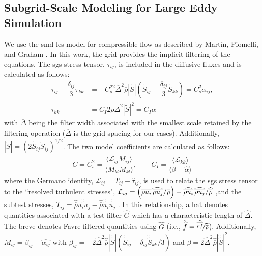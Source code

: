 \subsection{Subgrid-Scale Modeling for Large Eddy Simulation}
We use the \gls{smd} \gls{les} model for compressible flow as described by Mart\'{i}n, Piomelli, and Graham \cite{LES_Comp}. In this work, the grid provides the implicit filtering of the equations. The \gls{sgs} stress tensor, $\tau_{ij}$, is included in the diffusive fluxes and is calculated as follows:
\begin{equation}
\begin{aligned}
	\tau_{ij} - \dfrac{\delta_{ij}}{3}\tau_{kk} &= -C_s^22\overline{\Delta}^2 \overline{\rho} |\widetilde{S}| \left( \widetilde{S}_{ij} - \dfrac{\delta_{ij}}{3} \widetilde{S}_{kk} \right) = C_s^2 \alpha_{ij},  \\
	 \tau_{kk} &= C_I 2\overline{\rho} \overline{\Delta}^2 |\widetilde{S}|^2 = C_I \alpha
\end{aligned}
\end{equation}
with $\overline{\Delta}$ being the filter width associated with the smallest scale retained by the filtering operation ($\overline{\Delta}$ is the grid spacing for our cases). Additionally, $|\widetilde{S}| = (2\widetilde{S}_{ij}\widetilde{S}_{ij})^{1/2}$. The two model coefficients are calculated as follows:
\begin{equation} \label{smd_coeffs}
\begin{aligned}
	C = C_s^2 = \dfrac{\langle \mathcal{L}_{ij} M_{ij} \rangle}{\langle M_{kl}M_{kl} \rangle}, \quad \quad C_I = \dfrac{ \langle \mathcal{L}_{kk} \rangle}{\langle \beta - \widehat{\alpha} \rangle}
\end{aligned}
\end{equation}
where the Germano identity, $\mathcal{L}_{ij} = T_{ij} - \widehat{\tau}_{ij}$, is used to relate the \gls{sgs} stress tensor to the ``resolved turbulent stresses", $\mathcal{L}_{ij} = \left( \overline{\rho u_i} \widehat{ \hspace{1.5pt} \overline{\rho u_j}}/\overline{\rho} \right) - \widehat{ \overline{\rho u_i}} \hspace{1.5pt} \widehat{\overline{\rho u_j}}/\widehat{\overline{\rho}}$ ,and the subtest stresses, $T_{ij} = \widehat{\overline{\rho}} \breve{\widetilde{u_i u_j}} - \widehat{\overline{\rho}} \breve{\widetilde{u_i}} \breve{\widetilde{u_j}}$ \cite{germano}. In this relationship, a hat denotes quantities associated with a test filter $\widehat{G}$ which has a characteristic length of $\widehat{\Delta}$. The breve denotes Favre-filtered quantities using $\widehat{G}$ (i.e., $\breve{\widetilde{f}} = \nicefrac{\widehat{\overline{\rho f}}}{\widehat{\overline{\rho}}}$). Additionally, $M_{ij} = \beta_{ij} - \widehat{\alpha_{ij}}$ with $\beta_{ij} = -2\widehat{\Delta}^2 \widehat{\overline{\rho}} |\breve{\widetilde{S}}| \left( \breve{\widetilde{S}}_{ij} - \delta_{ij} \breve{\widetilde{S}}_{kk}/3  \right)$ and $\beta = 2 \widehat{\Delta}^2  \widehat{\overline{\rho}} |\breve{\widetilde{S}}|^2 $. 


